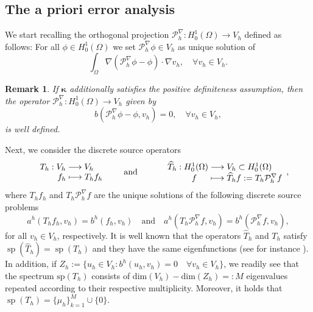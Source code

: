 \documentclass[final,reqno]{elsarticle}
\newtheorem{remark}{Remark}[section]
\def\sp{\mathop{\mathrm{sp}}\nolimits}
\def\bkappa{\boldsymbol{\kappa}}
\DeclareMathOperator{\spec}{sp}
\begin{document}
\subsection{The a priori error analysis}
\label{Sec:aPriori}
We start recalling the orthogonal projection $\mathcal{P}_h^{\nabla}:H_0^1(\Omega)\to V_h$ defined as follows: For all $\phi\in H_0^1(\Omega)$ we set  $\mathcal{P}_h^{\nabla}\phi\in V_h$ as unique solution of 
$$ \int_\Omega \nabla (\mathcal{P}_h^{\nabla} \phi-\phi) \cdot \nabla v_h,\quad  \forall v_h\in V_h.$$
\begin{remark}\label{RemDefPos}
    If $\bkappa$  additionally satisfies the positive definiteness assumption, then the operator $\mathcal{P}_h^{\nabla }:H_0^1(\Omega)\to V_h$ given by     $$b(\mathcal{P}_h^{\nabla}\phi-\phi,v_h)=0,\quad \forall v_h \in V_h,$$
    is well defined.
\end{remark}


Next, we consider the discrete source operators 
\begin{equation*}
    \begin{array}{rl}
&T_h:V_h\longrightarrow V_h  \\
& \hspace*{0.725cm} f_h \longmapsto  T_hf_h      
    \end{array}
\qquad 
\mbox{and}
\qquad 
 \begin{array}{rl}
&\widehat{T}_h:H_0^1(\Omega)\longrightarrow V_h\subset H_0^1(\Omega)  \\
& \hspace*{1cm} f \hspace*{0.475cm}\longmapsto  \widehat{T}_hf:=T_h\mathcal{P}_h^{\nabla}f 
\end{array},
\end{equation*}
where $T_hf_h$ and $T_h\mathcal{P}_h^{\nabla}f$ are the unique solutions of the following discrete source problems
\begin{equation}\label{defTh_hat}
 a^h(T_hf_h,v_h)=b^h(f_h,v_h)
\quad
\mbox{and}
\quad
 a^h(T_h\mathcal{P}_h^{\nabla}f,v_h)=b^h(\mathcal{P}_h^{\nabla}f,v_h),
\end{equation}
for all $v_h\in V_h$, respectively. It is well known that the operators $\widehat{T}_h$ and $T_h$ satisfy  $\spec(\widehat{T}_h)=\spec(T_h)$ and they have the same eigenfunctions (see for instance \cite{DV_camwa2022}). In addition, if $Z_h:=\{u_h\in V_h: b^h(u_h,v_h)=0 \quad \forall v_h\in V_h\}$, we readily see that the spectrum $\mathrm{sp}(T_h)$ consists of $\mathrm{dim}(V_h)-\mathrm{dim}(Z_h)=:M$ eigenvalues repeated according to their respective multiplicity. Moreover, it holds that $\sp(T_h)=\{\mu_h\}_{k=1}^{M}\cup \{ 0 \}$.  
\end{document}
